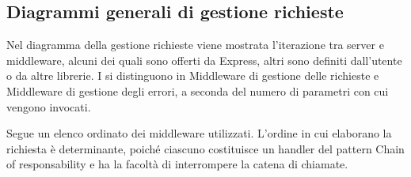 \subsection{Diagrammi generali di gestione richieste}
Nel diagramma della gestione richieste viene mostrata l'iterazione tra server e middleware, alcuni dei quali sono offerti da Express, altri sono definiti dall'utente o da altre librerie. I  si distinguono in Middleware di gestione delle richieste e Middleware di gestione degli errori, a seconda del numero di parametri con cui vengono invocati.

Segue un elenco ordinato dei middleware utilizzati. L'ordine in cui elaborano la richiesta è determinante, poiché ciascuno costituisce un handler del pattern Chain of responsability e ha la facoltà di interrompere la catena di chiamate.


